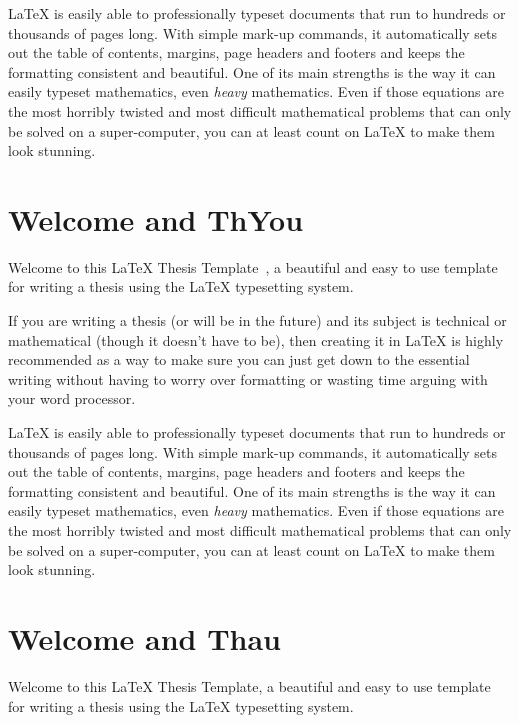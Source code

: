 \LaTeX{} is easily able to professionally typeset documents that run to hundreds or thousands of pages long. With simple mark-up commands, it automatically sets out the table of contents, margins, page headers and footers and keeps the formatting consistent and beautiful. One of its main strengths is the way it can easily typeset mathematics, even \emph{heavy} mathematics. Even if those equations are the most horribly twisted and most difficult mathematical problems that can only be solved on a super-computer, you can at least count on \LaTeX{} to make them look stunning.


\section{Welcome and ThYou}\label{sec:weome}
Welcome to this \LaTeX{} Thesis Template~\parencite{Reference1}, a beautiful and easy to use template for writing a thesis using the \LaTeX{} typesetting system.

If you are writing a thesis (or will be in the future) and its subject is technical or mathematical (though it doesn't have to be), then creating it in \LaTeX{} is highly recommended as a way to make sure you can just get down to the essential writing without having to worry over formatting or wasting time arguing with your word processor.

\LaTeX{} is easily able to professionally typeset documents that run to hundreds or thousands of pages long. With simple mark-up commands, it automatically sets out the table of contents, margins, page headers and footers and keeps the formatting consistent and beautiful. One of its main strengths is the way it can easily typeset mathematics, even \emph{heavy} mathematics. Even if those equations are the most horribly twisted and most difficult mathematical problems that can only be solved on a super-computer, you can at least count on \LaTeX{} to make them look stunning.


\section{Welcome and Thau}\label{sec:welcoe}
Welcome to this \LaTeX{} Thesis Template, a beautiful and easy to use template for writing a thesis using the \LaTeX{} typesetting system.

